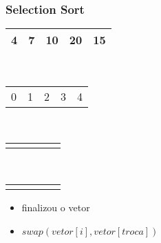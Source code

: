 \documentclass{beamer}
\begin{document}
\begin{frame}
    \frametitle{Selection Sort}
    \begin{center}
        \begin{table}
            \begin{tabular}{| p{0.25cm} | p{0.25cm} | p{0.25cm} | p{0.25cm} | p{0.25cm} |}
                \hline
                4 & 7 & 10 & 20 & 15 \\ \hline
            \end{tabular} \\
            \begin{tabular}{p{0.25cm} p{0.25cm} p{0.25cm} p{0.25cm} p{0.25cm}}
                0 & 1 & 2 & 3 & 4
            \end{tabular} \\
            \begin{tabular}{p{0.25cm} p{0.25cm} p{0.25cm} p{0.25cm} p{0.25cm}}
                 & & & \color{blue}{$\uparrow$} & \color{red}{$\uparrow$}
            \end{tabular} \\
            \begin{tabular}{p{0.25cm} p{0.25cm} p{0.25cm} p{0.25cm} p{0.25cm}}
                 & & & \color{blue}{i} & \color{red}{j}
            \end{tabular}
        \end{table}
	\end{center}
    \color{green}{$troca = 4$}
    \begin{itemize}[<+->]
        \item finalizou o vetor
        \item $swap(vetor[i], vetor[troca])$
    \end{itemize}
\end{frame}
\end{document}
